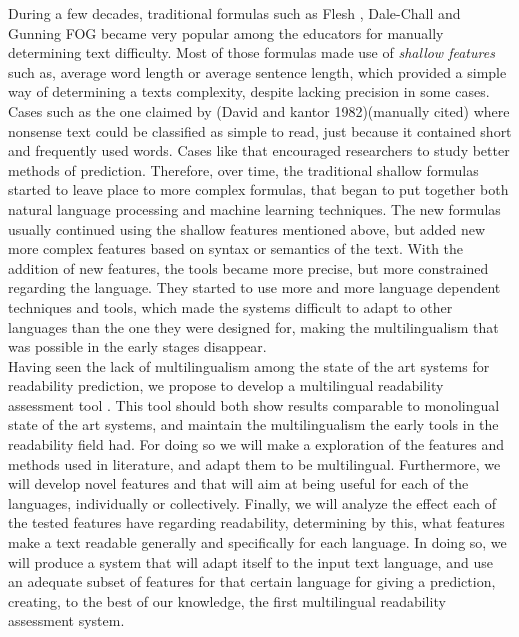 \documentclass[12pt]{article}
\begin{document}
During a few decades, traditional formulas such as Flesh \cite{flesch1948new}, Dale-Chall \cite{chall1995readability} and Gunning FOG  \cite{albright1996readability} became very popular among the educators for manually determining text difficulty. Most of those formulas made use of \textit{shallow features} such as, average word length or average sentence length, which provided a simple way of determining a texts complexity, despite lacking precision in some cases. Cases such as the one claimed by (David and kantor 1982){\color{red}(manually cited)} where nonsense text could be classified as simple to read, just because it contained short and frequently used words. Cases like that  encouraged researchers to study better methods of prediction.   Therefore, over time, the traditional shallow formulas started to leave place to more complex formulas\cite{franccois2012ai}\cite{aluisio2010readability}, that began to put together both natural language processing and machine learning techniques. The new formulas usually continued using the shallow  features  mentioned above, but added new more complex features based on syntax or semantics of the text. With the addition of new features, the tools became more precise, but more constrained regarding the language. They started to use more and more language dependent techniques and tools, which made the systems difficult to adapt to other languages than the one they were designed for, making the multilingualism that was possible in the early stages disappear.  \\


Having seen the lack of multilingualism among the state of the art systems for readability prediction, we propose to develop a multilingual readability assessment tool . This tool should both show results comparable to monolingual state of the art systems,  and  maintain the multilingualism the early tools in the readability field had. For doing so we will make a exploration of the features and methods used in literature, and adapt them to be multilingual. Furthermore, we will develop novel features  and that will aim at being useful for each of the languages, individually or collectively. Finally, we will analyze the effect each of the tested features have regarding readability, determining by this, what features make a text readable generally and specifically for each language. In doing so, we will produce a system that will adapt itself to the input text language, and use an adequate subset of features for that certain language for giving a prediction, creating, to the best of our knowledge, the first multilingual readability assessment system.\\
\end{document}
